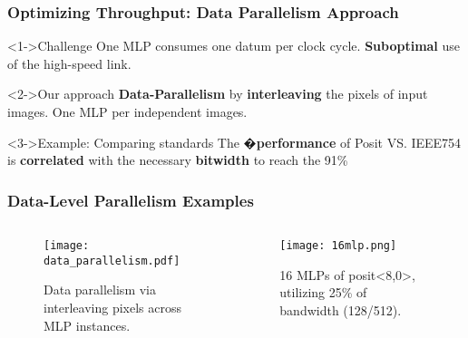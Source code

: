 \begin{frame}
    \frametitle{Optimizing Throughput: Data Parallelism Approach}

	\begin{exampleblock}<1->{Challenge}
		One MLP consumes one datum per clock cycle. \textbf{Suboptimal} use of the high-speed link.
	\end{exampleblock}

	\begin{alertblock}<2->{Our approach}
		\textbf{Data-Parallelism} by \textbf{interleaving} the pixels of input images. One MLP per independent images.
	\end{alertblock}

	\begin{block}<3->{Example: Comparing standards}
		The �\textbf{performance} of Posit VS. IEEE754 is \textbf{correlated} with the necessary \textbf{bitwidth} to reach the 91\%
	\end{block}

\end{frame}

\begin{frame}
    \frametitle{Data-Level Parallelism Examples}

    \begin{columns}
        \begin{column}{0.5\textwidth}
	    \begin{figure}[H]
            \centering
            \texttt{[image: data\_parallelism.pdf]}
            \caption{Data parallelism via interleaving pixels across MLP instances.}
            \label{fig:data_parallelism}
	    \end{figure}
        \end{column}

        \begin{column}{0.5\textwidth}
	    \begin{figure}[H]
            \centering
            \texttt{[image: 16mlp.png]}
		    \caption{16 MLPs of posit<8,0>, utilizing 25\% of bandwidth (128/512).}
            \label{fig:16mlp}
	    \end{figure}
        \end{column}
    \end{columns}

\end{frame}

